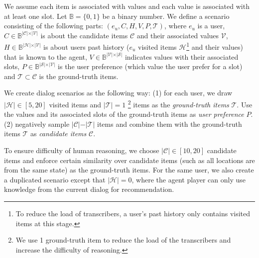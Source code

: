 \documentclass[11pt,a4paper]{article}
\makeatletter
\DeclareRobustCommand\onedot{\futurelet\@let@token\@onedot}
\def\onedot{. }
\def\eg{\emph{e.g}\onedot} \def\Eg{\emph{E.g}\onedot}
\makeatother
\begin{document}
We assume each item is associated with values and each value is associated with at least one slot. 
Let $\mathbb{B}=\{0, 1\}$ be a binary number.
We define a scenario consisting of the following parts: $(e_u, C, H, V, P, \mathcal{T} )$, where $e_u$ is a user, $C \in \mathbb{B}^{\vert \mathcal{C} \vert \times \vert \mathcal{V} \vert}$ is about the candidate items $\mathcal{C}$ and their associated values $\mathcal{V}$, $H \in \mathbb{B}^{\vert \mathcal{H} \vert \times \vert \mathcal{V} \vert}$ is about users past history ($e_u$ visited items $\mathcal{H}$\footnote{To reduce the load of transcribers, a user's past history only contains visited items at this stage.} and their values) that is known to the agent, $V \in \mathbb{B}^{\vert \mathcal{V} \vert \times \vert \mathcal{S} \vert}$ indicates values with their associated slots, $P \in \mathbb{B}^{\vert \mathcal{S} \vert \times \vert \mathcal{V} \vert} $ is the user preference (which value the user prefer for a slot) and $\mathcal{T} \subset \mathcal{C}$ is the ground-truth items. 

We create dialog scenarios as the following way:
(1) for each user, we draw $\vert \mathcal{H} \vert \in [5, 20]$ visited items and $\vert \mathcal{T} \vert = 1$ \footnote{We use 1 ground-truth item to reduce the load of the transcribers and increase the difficulty of reasoning.} items 
as the \textit{ground-truth items} $\mathcal{T}$. Use the values and its associated slots of the ground-truth items as \textit{user preference} $P$.
(2) negatively sample $\vert \mathcal{C} \vert - \vert \mathcal{T} \vert $ items and combine them with the ground-truth items $\mathcal{T}$ as \textit{candidate items} $\mathcal{C}$.

To ensure difficulty of human reasoning, we choose $\vert \mathcal{C} \vert \in [10, 20]$ candidate items and enforce certain similarity over candidate items (such as all locations are from the same state) as the ground-truth items.
For the same user, we also create a duplicated scenario except that $\vert \mathcal{H} \vert = 0$, where the agent player can only use knowledge from the current dialog for recommendation.
\end{document}
